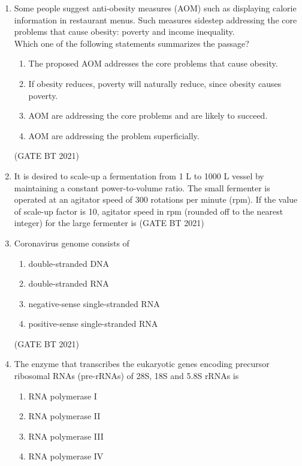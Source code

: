 \documentclass[journal,12pt,onecolumn]{IEEEtran}
\theoremstyle{remark}
\begin{document}
\begin{enumerate}
\item Some people suggest anti-obesity measures (AOM) such as displaying calorie information in restaurant menus. Such measures sidestep addressing the core problems that cause obesity: poverty and income inequality.\\
Which one of the following statements summarizes the passage?

\begin{enumerate}
\item The proposed AOM addresses the core problems that cause obesity.
\item If obesity reduces, poverty will naturally reduce, since obesity causes poverty.
\item AOM are addressing the core problems and are likely to succeed.
\item AOM are addressing the problem superficially.
\end{enumerate}

\hfill (GATE BT 2021)
\item It is desired to scale-up a fermentation from 1 L to 1000 L vessel by maintaining a constant power-to-volume ratio. The small fermenter is operated at an agitator speed of 300 rotations per minute (rpm). If the value of scale-up factor is 10, agitator speed in rpm (rounded off to the nearest integer) for the large fermenter is
\hfill (GATE BT 2021)


\item Coronavirus genome consists of

\begin{enumerate}
\item double-stranded DNA
\item double-stranded RNA
\item negative-sense single-stranded RNA
\item positive-sense single-stranded RNA
\end{enumerate}

\hfill (GATE BT 2021)

\item The enzyme that transcribes the eukaryotic genes encoding precursor ribosomal RNAs (pre-rRNAs) of 28S, 18S and 5.8S rRNAs is

\begin{enumerate}
\item RNA polymerase I
\item RNA polymerase II
\item RNA polymerase III
\item RNA polymerase IV
\end{enumerate}


\end{enumerate}
\end{document}

